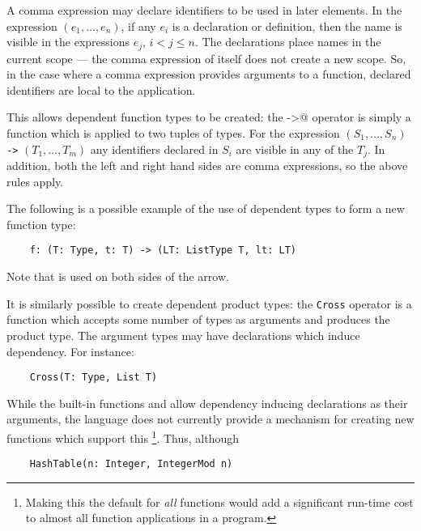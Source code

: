 A comma expression may declare identifiers to
be used in later elements. In the expression $(e_1, \ldots, e_n)$, if
any $e_i$ is a declaration or definition, then the name is visible in the
expressions $e_j$, $i < j \le n$.
The declarations place names in the current scope --- the
comma expression of itself does not create a new scope.
So, in the case where a comma expression provides arguments to a function,
declared identifiers are local to the application.

This allows dependent function types to be created: the
\verb@->@ operator is simply a function which is applied to two tuples
of types.  For the expression
$(S_1,\ldots, S_n)$ {\tt ->} $(T_1, \ldots, T_m)$
any identifiers declared in $S_i$ are visible in any of the $T_j$. In
addition, both the left and right hand sides are comma expressions, so
the above rules apply.

The following is a possible example of the use of dependent types to
form a new function type:

\begin{small}
\begin{verbatim}
    f: (T: Type, t: T) -> (LT: ListType T, lt: LT)
\end{verbatim}
\end{small}

Note that  is used on both sides of the arrow.

It is similarly possible to create dependent product types:
the \verb"Cross" operator is a function which accepts some
number of types as arguments and produces the product type.
The argument types may have declarations which induce dependency.
For instance:

\begin{small}
\begin{verbatim}
    Cross(T: Type, List T)
\end{verbatim}
\end{small}

While the built-in functions \ttin{->} and  allow
dependency inducing declarations as their arguments,
the language does not currently provide a mechanism for creating new functions
which support this%
\footnote{Making this the default for {\em all} functions would 
add a significant run-time cost to almost all function applications in a
program.}.
Thus, although

\begin{small}
\begin{verbatim}
    HashTable(n: Integer, IntegerMod n)
\end{verbatim}
\end{small}

